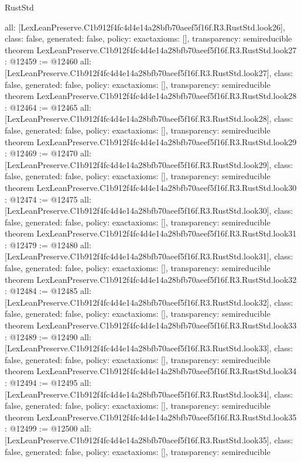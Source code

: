 \begin{lexlean}{RustStd}
\begin{coremodule}
{  all: [LexLeanPreserve.C1b912f4fc4d4e14a28bfb70aeef5f16f.R3.RustStd.look26],
  class: false,
  generated: false,
  policy: exact{axioms: []},
  transparency: semireducible
}
theorem LexLeanPreserve.C1b912f4fc4d4e14a28bfb70aeef5f16f.R3.RustStd.look27 : @12459 := @12460 {
  all: [LexLeanPreserve.C1b912f4fc4d4e14a28bfb70aeef5f16f.R3.RustStd.look27],
  class: false,
  generated: false,
  policy: exact{axioms: []},
  transparency: semireducible
}
theorem LexLeanPreserve.C1b912f4fc4d4e14a28bfb70aeef5f16f.R3.RustStd.look28 : @12464 := @12465 {
  all: [LexLeanPreserve.C1b912f4fc4d4e14a28bfb70aeef5f16f.R3.RustStd.look28],
  class: false,
  generated: false,
  policy: exact{axioms: []},
  transparency: semireducible
}
theorem LexLeanPreserve.C1b912f4fc4d4e14a28bfb70aeef5f16f.R3.RustStd.look29 : @12469 := @12470 {
  all: [LexLeanPreserve.C1b912f4fc4d4e14a28bfb70aeef5f16f.R3.RustStd.look29],
  class: false,
  generated: false,
  policy: exact{axioms: []},
  transparency: semireducible
}
theorem LexLeanPreserve.C1b912f4fc4d4e14a28bfb70aeef5f16f.R3.RustStd.look30 : @12474 := @12475 {
  all: [LexLeanPreserve.C1b912f4fc4d4e14a28bfb70aeef5f16f.R3.RustStd.look30],
  class: false,
  generated: false,
  policy: exact{axioms: []},
  transparency: semireducible
}
theorem LexLeanPreserve.C1b912f4fc4d4e14a28bfb70aeef5f16f.R3.RustStd.look31 : @12479 := @12480 {
  all: [LexLeanPreserve.C1b912f4fc4d4e14a28bfb70aeef5f16f.R3.RustStd.look31],
  class: false,
  generated: false,
  policy: exact{axioms: []},
  transparency: semireducible
}
theorem LexLeanPreserve.C1b912f4fc4d4e14a28bfb70aeef5f16f.R3.RustStd.look32 : @12484 := @12485 {
  all: [LexLeanPreserve.C1b912f4fc4d4e14a28bfb70aeef5f16f.R3.RustStd.look32],
  class: false,
  generated: false,
  policy: exact{axioms: []},
  transparency: semireducible
}
theorem LexLeanPreserve.C1b912f4fc4d4e14a28bfb70aeef5f16f.R3.RustStd.look33 : @12489 := @12490 {
  all: [LexLeanPreserve.C1b912f4fc4d4e14a28bfb70aeef5f16f.R3.RustStd.look33],
  class: false,
  generated: false,
  policy: exact{axioms: []},
  transparency: semireducible
}
theorem LexLeanPreserve.C1b912f4fc4d4e14a28bfb70aeef5f16f.R3.RustStd.look34 : @12494 := @12495 {
  all: [LexLeanPreserve.C1b912f4fc4d4e14a28bfb70aeef5f16f.R3.RustStd.look34],
  class: false,
  generated: false,
  policy: exact{axioms: []},
  transparency: semireducible
}
theorem LexLeanPreserve.C1b912f4fc4d4e14a28bfb70aeef5f16f.R3.RustStd.look35 : @12499 := @12500 {
  all: [LexLeanPreserve.C1b912f4fc4d4e14a28bfb70aeef5f16f.R3.RustStd.look35],
  class: false,
  generated: false,
  policy: exact{axioms: []},
  transparency: semireducible
}
\end{coremodule}
\end{lexlean}
